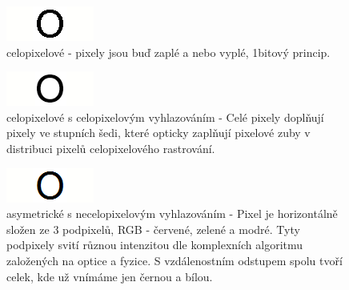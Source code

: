 \documentclass[a4paper]{article}
\begin{document}
\begin{figure}[H]
  \includegraphics[width=\linewidth]{pics/o_1bit.png}
  \caption{celopixelové - pixely jsou buď zaplé a nebo vyplé, 1bitový princip.}
\end{figure}

\begin{figure}[H]
  \includegraphics[width=\linewidth]{pics/1bit_fullanti.png}
  \caption{celopixelové s celopixelovým vyhlazováním - Celé pixely doplňují pixely ve stupních šedi, které opticky zaplňují pixelové zuby v distribuci pixelů celopixelového rastrování.}
\end{figure}

\begin{figure}[H]
  \includegraphics[width=\linewidth]{pics/o_TT.png}
  \caption{asymetrické s necelopixelovým vyhlazováním - Pixel je horizontálně složen ze 3 podpixelů, RGB - červené, zelené a modré. Tyty podpixely svití různou intenzitou dle komplexních algoritmu založených na optice a fyzice. S vzdálenostním odstupem spolu tvoří celek, kde už vnímáme jen černou a bílou. }
\end{figure}
\end{document}
